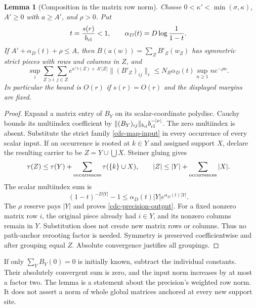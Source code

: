 \documentclass[11pt]{article}
\newtheorem{lemma}[theorem]{Lemma}
\theoremstyle{remark}
\begin{document}
\begin{lemma}[Composition in the matrix row norm]
\label{cdc-precision-lemma}
Choose $0<\kappa'<\min(\sigma,\kappa)$, $A'\geq0$ with
$a\geq A'$, and $\rho>0$. Put
\begin{equation}
 t=\frac{s(r)}{b_{\rm cl}}<1,\qquad
 \alpha_D(t)=D\log\frac1{1-t}.
 \label{cdc-alpha}
\end{equation}
If $A'+\alpha_D(t)+\rho\leq A$, then
$B(a(w))=\sum_Z B'_Z(w_Z)$ has symmetric strict pieces with
rows and columns in $Z$, and
\begin{equation}
 \sup_i\sum_{Z\ni i}\sum_{j\in Z}
 e^{\kappa'\tau(Z)+A'|Z|}\|(B'_Z)_{ij}\|_r
 \leq N_B\alpha_D(t)
                   \sup_{n\geq1}n e^{-\rho n}.
 \label{cdc-precision-output}
\end{equation}
In particular the bound is $O(r)$ if $s(r)=O(r)$ and the
displayed margins are fixed.
\end{lemma}
\begin{proof}
Expand a matrix entry of $B_Y$ on its scalar-coordinate polydisc.
Cauchy bounds its multiindex coefficient by
$\|(B_Y)_{ij}\|_{b_{\rm cl}}b_{\rm cl}^{-|\nu|}$.
The zero multiindex is absent. Substitute the strict family
\eqref{cdc-map-input} in every occurrence of every scalar input.
If an occurrence is rooted at $k\in Y$ and assigned support $X$,
declare the resulting carrier to be
$Z=Y\cup\bigcup X$. Steiner gluing gives
\begin{equation}
 \tau(Z)\leq\tau(Y)+\sum_{\rm occurrences}
                            \tau(\{k\}\cup X),\qquad
 |Z|\leq|Y|+\sum_{\rm occurrences}|X|.
 \label{cdc-precision-gluing}
\end{equation}
The scalar multiindex sum is
\begin{equation}
 (1-t)^{-D|Y|}-1
 \leq\alpha_D(t)|Y|e^{\alpha_D(t)|Y|}.
 \label{cdc-precision-generating}
\end{equation}
The $\rho$ reserve pays $|Y|$ and proves
\eqref{cdc-precision-output}. For a fixed nonzero matrix row
$i$, the original piece already had $i\in Y$, and its nonzero
columns remain in $Y$. Substitution does not create new matrix
rows or columns. Thus no path-anchor rerooting factor is needed.
Symmetry is preserved coefficientwise and after grouping equal
$Z$. Absolute convergence justifies all groupings.
\end{proof}

If only $\sum_YB_Y(0)=0$ is initially known, subtract the
individual constants. Their absolutely convergent sum is zero,
and the input norm increases by at most a factor two. The lemma
is a statement about the precision's weighted row norm. It does
not assert a norm of whole global matrices anchored at every
new support site.
\end{document}
